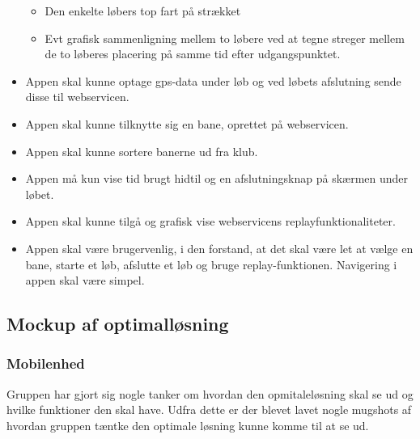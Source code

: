 \begin{itemize}
\begin{itemize}
\item Den enkelte løbers top fart på strækket
\item Evt grafisk sammenligning mellem to løbere ved at tegne streger mellem de to løberes placering på samme tid efter udgangspunktet.
\end{itemize}
\item Appen skal kunne optage gps-data under løb og ved løbets afslutning sende disse til webservicen.
\item Appen skal kunne tilknytte sig en bane, oprettet på webservicen.
\item Appen skal kunne sortere banerne ud fra klub.
\item Appen må kun vise tid brugt hidtil og en afslutningsknap på skærmen under løbet.
\item Appen skal kunne tilgå og grafisk vise webservicens replayfunktionaliteter.
\item Appen skal være brugervenlig, i den forstand, at det skal være let at vælge en bane, starte et løb, afslutte et løb og bruge replay-funktionen. Navigering i appen skal være simpel.
\end{itemize}

\subsection{Mockup af optimalløsning}
\subsubsection{Mobilenhed}
Gruppen har gjort sig nogle tanker om hvordan den opmitaleløsning skal se ud og hvilke funktioner den skal have. Udfra dette er der blevet lavet nogle mugshots af hvordan gruppen tæntke den optimale løsning kunne komme til at se ud.

